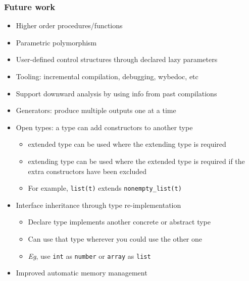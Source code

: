 \documentclass[12pt]{beamer}
\begin{document}
\begin{frame}[fragile]
\frametitle{Future work}
\begin{itemize}
\item Higher order procedures/functions
\item Parametric polymorphism
\item User-defined control structures through declared lazy parameters
\item Tooling:  incremental compilation, debugging, wybedoc, etc
\item Support downward analysis by using info from past compilations
\item Generators:  produce multiple outputs one at a time
\item Open types: a type can add constructors to another type
  \begin{itemize}
  \item extended type can be used where the extending type is required
  \item extending type can be used where the extended type is required if the
  extra constructors have been excluded
  \item For example, \texttt{list(t)} extends \texttt{nonempty\_list(t)}
  \end{itemize}
\item Interface inheritance through type re-implementation
  \begin{itemize}
  \item Declare type implements another concrete or abstract type
  \item Can use that type wherever you could use the other one
  \item \emph{Eg}, use \texttt{int} as \texttt{number} or \texttt{array} as
    \texttt{list}
  \end{itemize}
\item Improved automatic memory management
\end{itemize}
\end{frame}
\end{document}
